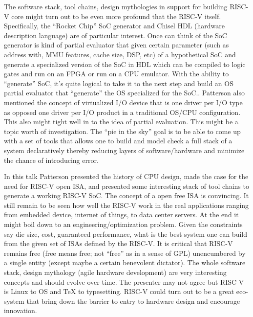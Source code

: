 \documentclass[a4paper, 11pt]{article} %
\begin{document}
The software stack, tool chains, design mythologies in support for building RISC-V core might turn out to be even more profound that the RISC-V itself. Specifically, the ``Rocket Chip'' SoC generator and Chisel HDL (hardware description language) are of particular interest. Once can think of the SoC generator is kind of partial evaluator that given certain parameter (such as address with, MMU features, cache size, DSP, etc) of a hypothetical SoC and generate a specialized version of the SoC in HDL which can be compiled to logic gates and run on an FPGA or run on a CPU emulator. With the ability to ``generate'' SoC, it's quite logical to take it to the next step and build an OS partial evaluator that ``generate'' the OS specialized for the SoC.. Patterson also mentioned the concept of virtualized I/O device that is one driver per I/O type as opposed one driver per I/O product in a traditional OS/CPU configuration. This also might tight well in to the idea of partial evaluation. This might be a topic worth of investigation. The ``pie in the sky'' goal is to be able to come up with a set of tools that allows one to build and model check a full stack of a system declaratively thereby reducing layers of software/hardware and minimize the chance of introducing error. 


In this talk Patterson presented the history of CPU design, made the case for the need for RISC-V open ISA, and presented some interesting stack of tool chains to generate a working RISC-V SoC. The concept of a open free ISA is convincing. It still remain to be seen how well the RISC-V work in the real applications ranging from embedded device, internet of things, to data center servers. At the end it might boil down to an  engineering/optimization problem. Given the constraints say die size, cost, guaranteed performance, what is the best system one can build from the given set of ISAs defined by the RISC-V. It is critical that RISC-V remains free (free means free; not ``free'' as in a sense of GPL) unencumbered by a single entity (except maybe a certain benevolent dictator). The whole software stack, design mythology (agile hardware development) are very interesting concepts and should evolve over time. The presenter may not agree but RISC-V is Linux to OS  and TeX to typesetting. RISC-V could turn out to be a great eco-system that bring down the barrier to entry to hardware design and encourage innovation. 
\end{document}
